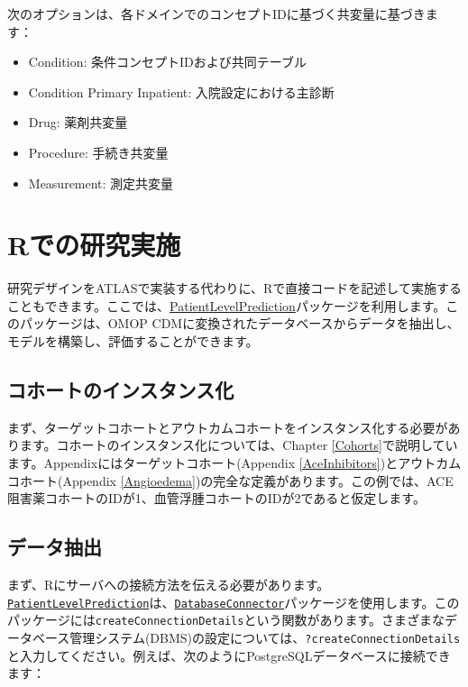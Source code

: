\documentclass[
  11pt]{book}
\providecommand{\tightlist}{%
  \setlength{\itemsep}{0pt}\setlength{\parskip}{0pt}}
\theoremstyle{definition}
\theoremstyle{definition}
\theoremstyle{definition}
\theoremstyle{definition}
\theoremstyle{remark}
\begin{document}
次のオプションは、各ドメインでのコンセプトIDに基づく共変量に基づきます：

\begin{itemize}
\tightlist
\item
  Condition: 条件コンセプトIDおよび共同テーブル
\item
  Condition Primary Inpatient: 入院設定における主診断
\item
  Drug: 薬剤共変量
\item
  Procedure: 手続き共変量
\item
  Measurement: 測定共変量
\end{itemize}

\section{Rでの研究実施}\label{rux3067ux306eux7814ux7a76ux5b9fux65bd}

研究デザインをATLASで実装する代わりに、Rで直接コードを記述して実施することもできます。ここでは、\href{https://ohdsi.github.io/PatientLevelPrediction/}{PatientLevelPrediction}パッケージを利用します。このパッケージは、OMOP CDMに変換されたデータベースからデータを抽出し、モデルを構築し、評価することができます。

\subsection{コホートのインスタンス化}\label{ux30b3ux30dbux30fcux30c8ux306eux30a4ux30f3ux30b9ux30bfux30f3ux30b9ux5316-2}

まず、ターゲットコホートとアウトカムコホートをインスタンス化する必要があります。コホートのインスタンス化については、Chapter \ref{Cohorts}で説明しています。Appendixにはターゲットコホート(Appendix \ref{AceInhibitors})とアウトカムコホート(Appendix \ref{Angioedema})の完全な定義があります。この例では、ACE阻害薬コホートのIDが1、血管浮腫コホートのIDが2であると仮定します。

\subsection{データ抽出}\label{ux30c7ux30fcux30bfux62bdux51fa-3}

まず、Rにサーバへの接続方法を伝える必要があります。\href{https://ohdsi.github.io/PatientLevelPrediction/}{\texttt{PatientLevelPrediction}}は、\href{https://ohdsi.github.io/DatabaseConnector/}{\texttt{DatabaseConnector}}パッケージを使用します。このパッケージには\texttt{createConnectionDetails}という関数があります。さまざまなデータベース管理システム(DBMS)の設定については、\texttt{?createConnectionDetails}と入力してください。例えば、次のようにPostgreSQLデータベースに接続できます：
\end{document}
